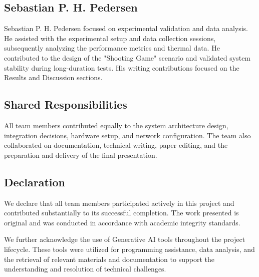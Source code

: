 \subsection*{Sebastian P. H. Pedersen}
Sebastian P. H. Pedersen focused on experimental validation and data analysis. He assisted with the experimental setup and data collection sessions, subsequently analyzing the performance metrics and thermal data. He contributed to the design of the "Shooting Game" scenario and validated system stability during long-duration tests. His writing contributions focused on the Results and Discussion sections.

\subsection*{Shared Responsibilities}
All team members contributed equally to the system architecture design, integration decisions, hardware setup, and network configuration. The team also collaborated on documentation, technical writing, paper editing, and the preparation and delivery of the final presentation.

\subsection*{Declaration}
We declare that all team members participated actively in this project and contributed substantially to its successful completion. The work presented is original and was conducted in accordance with academic integrity standards.

We further acknowledge the use of Generative AI tools throughout the project lifecycle. These tools were utilized for programming assistance, data analysis, and the retrieval of relevant materials and documentation to support the understanding and resolution of technical challenges.

